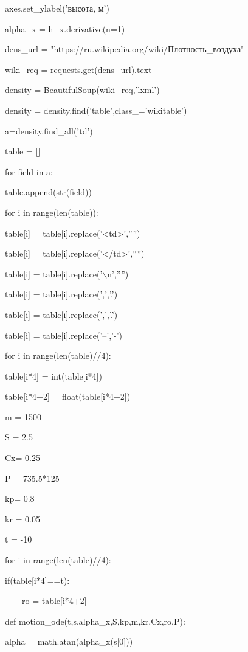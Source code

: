 \documentclass[A4paper,12pt]{article}
\theoremstyle{plain} %
\theoremstyle{definition} %
\theoremstyle{remark} %
\begin{document}
    \noindent axes.set\_ylabel('высота, м')
     
    \noindent alpha\_x = h\_x.derivative(n=1)
    
    \noindent dens\_url = "https://ru.wikipedia.org/wiki/Плотность\_воздуха"
    
    \noindent wiki\_req = requests.get(dens\_url).text
    
    \noindent density = BeautifulSoup(wiki\_req,'lxml')
    
    \noindent density = density.find('table',class\_='wikitable')

    \noindent a=density.find\_all('td')

    \noindent table = []
    
    \noindent for field in a:
    
    table.append(str(field))
    
    \noindent for i in range(len(table)):
    
    table[i] = table[i].replace('<td>','''')
    
    table[i] = table[i].replace('</td>','''')
    
    table[i] = table[i].replace('$\backslash$n','''')
    
    table[i] = table[i].replace(',','.')
    
    table[i] = table[i].replace(',','.')
    
    table[i] = table[i].replace('--','-') 
    
    \noindent for i in range(len(table)//4):
    
    table[i*4] = int(table[i*4])
    
    table[i*4+2] = float(table[i*4+2])
    
\noindent m = 1500

\noindent S = 2.5

\noindent Cx= 0.25

\noindent P = 735.5*125

\noindent kp= 0.8

\noindent kr = 0.05

\noindent t = -10

\noindent for i in range(len(table)//4):

    if(table[i*4]==t):
    
    \ \ \ \ ro = table[i*4+2]
    
    \noindent def motion\_ode(t,s,alpha\_x,S,kp,m,kr,Cx,ro,P):
    
    alpha = math.atan(alpha\_x(s[0]))
    
\end{document}
